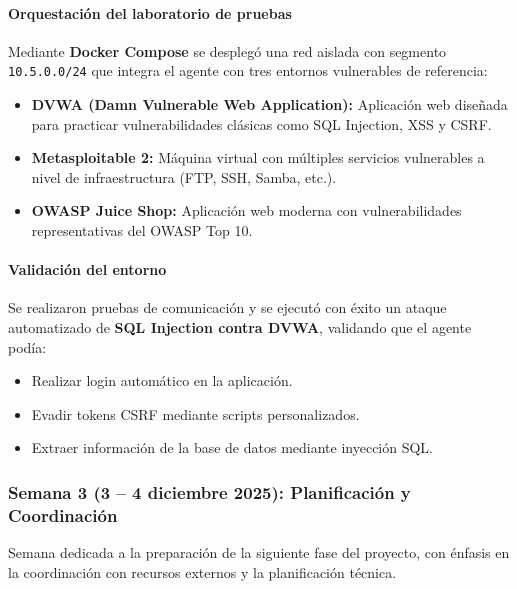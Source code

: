 \documentclass[12pt,a4paper]{article}
\begin{document}
\paragraph{Orquestación del laboratorio de pruebas}

Mediante \textbf{Docker Compose} se desplegó una red aislada con segmento \texttt{10.5.0.0/24} que integra el agente con tres entornos vulnerables de referencia:

\begin{itemize}
    \item \textbf{DVWA (Damn Vulnerable Web Application):} Aplicación web diseñada para practicar vulnerabilidades clásicas como SQL Injection, XSS y CSRF.
    \item \textbf{Metasploitable 2:} Máquina virtual con múltiples servicios vulnerables a nivel de infraestructura (FTP, SSH, Samba, etc.).
    \item \textbf{OWASP Juice Shop:} Aplicación web moderna con vulnerabilidades representativas del OWASP Top 10.
\end{itemize}

\paragraph{Validación del entorno}

Se realizaron pruebas de comunicación y se ejecutó con éxito un ataque automatizado de \textbf{SQL Injection contra DVWA}, validando que el agente podía:
\begin{itemize}
    \item Realizar login automático en la aplicación.
    \item Evadir tokens CSRF mediante scripts personalizados.
    \item Extraer información de la base de datos mediante inyección SQL.
\end{itemize}

\subsubsection{Semana 3 (3 -- 4 diciembre 2025): Planificación y Coordinación}

Semana dedicada a la preparación de la siguiente fase del proyecto, con énfasis en la coordinación con recursos externos y la planificación técnica.
\end{document}
